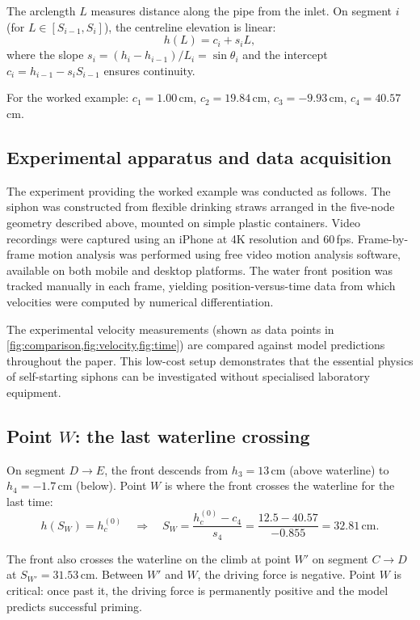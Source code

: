 \documentclass[11pt]{article}
\begin{document}
The arclength $L$ measures distance along the pipe from the inlet. On segment $i$ (for $L \in [S_{i-1}, S_i]$), the centreline elevation is linear:
\begin{equation}
  h(L) = c_i + s_i L,
  \label{eq:hL-piecewise}
\end{equation}
where the slope $s_i = (h_i - h_{i-1})/L_i = \sin\theta_i$ and the intercept $c_i = h_{i-1} - s_i S_{i-1}$ ensures continuity.

For the worked example: $c_1 = 1.00$\,cm, $c_2 = 19.84$\,cm, $c_3 = -9.93$\,cm, $c_4 = 40.57$\,cm.

\subsection{Experimental apparatus and data acquisition}

The experiment providing the worked example was conducted as follows. The siphon was constructed from flexible drinking straws arranged in the five-node geometry described above, mounted on simple plastic containers. Video recordings were captured using an iPhone at 4K resolution and 60\,fps. Frame-by-frame motion analysis was performed using free video motion analysis software, available on both mobile and desktop platforms. The water front position was tracked manually in each frame, yielding position-versus-time data from which velocities were computed by numerical differentiation.

The experimental velocity measurements (shown as data points in \cref{fig:comparison,fig:velocity,fig:time}) are compared against model predictions throughout the paper. This low-cost setup demonstrates that the essential physics of self-starting siphons can be investigated without specialised laboratory equipment.

\subsection{Point $W$: the last waterline crossing}

On segment $D \to E$, the front descends from $h_3 = 13$\,cm (above waterline) to $h_4 = -1.7$\,cm (below). Point $W$ is where the front crosses the waterline for the last time:
\[
  h(S_W) = h_c^{(0)} \quad \Rightarrow \quad S_W = \frac{h_c^{(0)} - c_4}{s_4} = \frac{12.5 - 40.57}{-0.855} = 32.81\,\text{cm}.
\]

The front also crosses the waterline on the climb at point $W'$ on segment $C \to D$ at $S_{W'} = 31.53$\,cm. Between $W'$ and $W$, the driving force is negative. Point $W$ is critical: once past it, the driving force is permanently positive and the model predicts successful priming.
\end{document}
